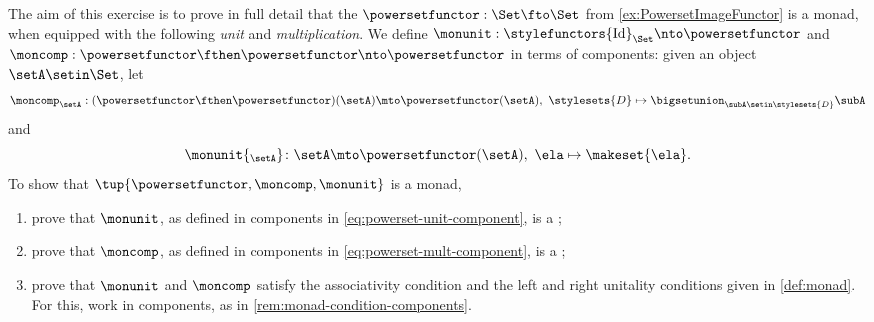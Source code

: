 \begin{gradedexercise}
    \label{ex:PowersetMonad}
    The aim of this exercise is to prove in full detail that the   $\powersetfunctor : \Set \fto \Set$ from \cref{ex:PowersetImageFunctor} is a monad, when equipped with the following \emph{unit} and \emph{multiplication}.
    We define $\monunit : \stylefunctors{\text{Id}}_{\Set}  \nto \powersetfunctor$ and $\moncomp : \powersetfunctor \fthen \powersetfunctor \nto \powersetfunctor$ in terms of components: given an object $\setA \setin \Set$, let
    \begin{equation}
        \label{eq:powerset-mult-component}
        \moncomp_{\setA} : (\powersetfunctor \fthen \powersetfunctor)(\setA) \mto \powersetfunctor(\setA), \ \stylesets{D} \mapsto \bigsetunion_{\subA \setin \stylesets{D}} \subA
    \end{equation}
    and
    \begin{equation}
        \label{eq:powerset-unit-component}
        \monunit{_\setA} \colon \setA \mto \powersetfunctor(\setA), \ \ela \mapsto \makeset{ \ela }.
    \end{equation}
    To show that $\tup{\powersetfunctor, \moncomp, \monunit}$ is a monad,
    \begin{enumerate}
        \item prove that $\monunit$, as defined in components in \cref{eq:powerset-unit-component}, is a ;
        \item prove that $\moncomp$, as defined in components in \cref{eq:powerset-mult-component}, is a ;
        \item prove that $\monunit$ and $\moncomp$ satisfy the associativity condition and the left and right unitality conditions given in \cref{def:monad}.
              For this, work in components, as in \cref{rem:monad-condition-components}.
    \end{enumerate}
\end{gradedexercise}

